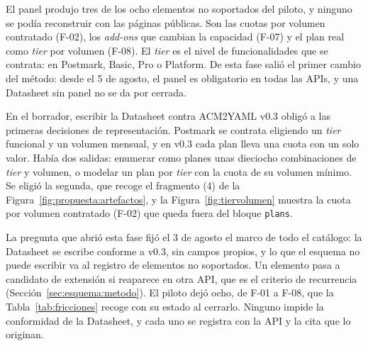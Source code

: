 El panel produjo tres de los ocho elementos no soportados del piloto, y ninguno se podía reconstruir con las páginas públicas.
Son las cuotas por volumen contratado (F-02), los \textit{add-ons} que cambian la capacidad (F-07) y el plan real como \textit{tier} por volumen (F-08).
El \textit{tier} es el nivel de funcionalidades que se contrata: en Postmark, Basic, Pro o Platform.
De esta fase salió el primer cambio del método: desde el 5 de agosto, el panel es obligatorio en todas las APIs, y una Datasheet sin panel no se da por cerrada.

En el borrador, escribir la Datasheet contra ACM2YAML v0.3 obligó a las primeras decisiones de representación.
Postmark se contrata eligiendo un \textit{tier} funcional y un volumen mensual, y en v0.3 cada plan lleva una cuota con un solo valor.
Había dos salidas: enumerar como planes unas dieciocho combinaciones de \textit{tier} y volumen, o modelar un plan por \textit{tier} con la cuota de su volumen mínimo.
Se eligió la segunda, que recoge el fragmento (4) de la Figura~\ref{fig:propuesta:artefactos}, y la Figura~\ref{fig:tiervolumen} muestra la cuota por volumen contratado (F-02) que queda fuera del bloque \texttt{plans}.

La pregunta que abrió esta fase fijó el 3 de agosto el marco de todo el catálogo: la Datasheet se escribe conforme a v0.3, sin campos propios, y lo que el esquema no puede escribir va al registro de elementos no soportados.
Un elemento pasa a candidato de extensión si reaparece en otra API, que es el criterio de recurrencia (Sección~\ref{sec:esquema:metodo}).
El piloto dejó ocho, de F-01 a F-08, que la Tabla~\ref{tab:fricciones} recoge con su estado al cerrarlo.
Ninguno impide la conformidad de la Datasheet, y cada uno se registra con la API y la cita que lo originan.

